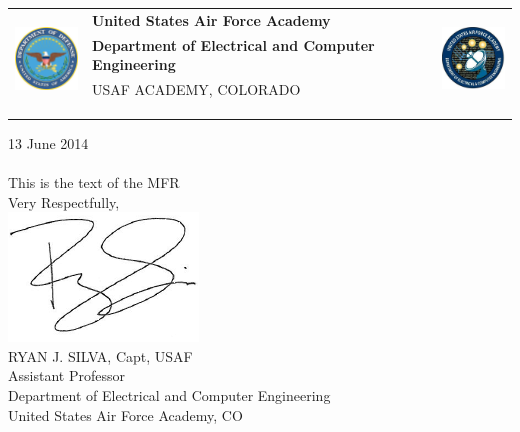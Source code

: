 \documentclass{article}
\begin{document}
	\noindent \begin{tabu} to \textwidth{l X[c] r}
	 & 
	\textbf{United States Air Force Academy} &  
	\\
	& \textbf{Department of Electrical and Computer Engineering} & \\
	& \tiny{USAF ACADEMY, COLORADO}\\
	\\ \\ \\
	\end{tabu}

	\hfill 13 June 2014 \\
	\\
\indent This is the text of the MFR \\

\vspace{10mm}
\hspace*{2.3in} \noindent Very Respectfully, \\
\hspace*{2.5in} \includegraphics[scale=.5]{silvasig}  \\
\hspace*{2.5in} RYAN J. SILVA, Capt, USAF \\
\hspace*{2.5in} Assistant Professor   \\
\hspace*{2.5in} Department of Electrical and Computer Engineering  \\
\hspace*{2.5in} United States Air Force Academy, CO  \\
\renewcommand\contentsname{Attachments}\tableofcontents
\end{document}
